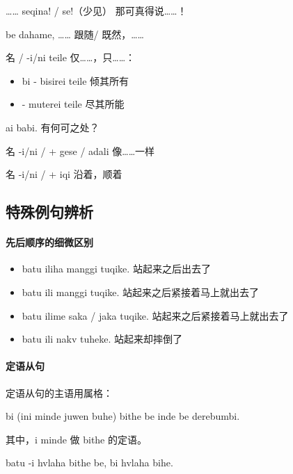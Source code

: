 \begin{des}
    \item[…… seqina! / se!（少见）] 那可真得说……！ 
    \item[\A be dahame, ……] 跟随\A / 既然\A ，……
    \item[名 / \V\ftn{形} -i/ni teile] 仅……，只……：
    \begin{itemize}
        \item \irg bi - bisirei teile 倾其所有
        \item {} - muterei teile 尽其所能  
    \end{itemize}
    \item[ai \V\ftn{形} babi.]有何可\V 之处？
    \item[名 -i/ni / \V\ftn{形} + gese / adali]像……一样
    \item[名 -i/ni / \V\ftn{形} + iqi] 沿着，顺着
\end{des}


\subsection{特殊例句辨析}

\paragraph{先后顺序的细微区别}

\begin{itemize}
    \item batu iliha manggi tuqike. 站起来之后出去了
    \item batu ili manggi tuqike. 站起来之后紧接着马上就出去了
    \item batu ilime saka / jaka tuqike. 站起来之后紧接着马上就出去了
    \item batu ili nakv tuheke. 站起来却摔倒了
\end{itemize}

\paragraph{定语从句} 定语从句的主语用属格：

bi (ini minde juwen buhe) bithe be inde be derebumbi.

其中，i minde   做 bithe 的定语。

batu -i hvlaha bithe be, bi  hvlaha bihe.
